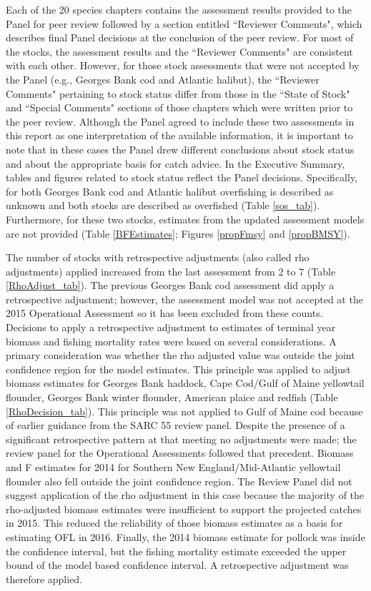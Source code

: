 Each of the 20 species chapters contains the assessment results provided to the Panel for peer review followed by a section entitled ``Reviewer Comments", which describes final Panel decisions at the conclusion of the peer review.  For most of the stocks, the assessment results and the ``Reviewer Comments" are consistent with each other.  However, for those stock assessments that were not accepted by the Panel (e.g., Georges Bank cod and Atlantic halibut), the ``Reviewer Comments" pertaining to stock status differ from those in the ``State of Stock" and ``Special Comments" sections of those chapters which were written prior to the peer review. Although the Panel agreed to include these two assessments in this report as one interpretation of the available information, it is important to note that in these cases the Panel drew different conclusions about stock status and about the appropriate basis for catch advice. In the Executive Summary, tables and figures related to stock status reflect the Panel decisions. Specifically, for both Georges Bank cod and Atlantic halibut overfishing is described as unknown and both stocks are described as overfished (Table \ref{sos_tab}). Furthermore, for these two stocks, estimates from the updated assessment models are not provided (Table \ref{BFEstimates}; Figures \ref{propFmsy} and \ref{propBMSY}).

The number of stocks with retrospective adjustments (also called rho adjustments)  applied increased from the last assessment from 2 to 7 (Table \ref{RhoAdjust_tab}). The previous Georges Bank cod assessment did apply a retrospective adjustment; however, the assessment model was not accepted  at the 2015 Operational Assessment so it has been excluded from these counts.  Decisions to apply a retrospective adjustment to estimates of terminal year biomass and fishing mortality rates were based on several considerations.   A primary consideration was whether the rho adjusted value was outside the joint confidence region for the model estimates.  This principle was applied to adjust biomass estimates for Georges Bank haddock, Cape Cod/Gulf of Maine yellowtail flounder, Georges Bank winter flounder, American plaice and redfish (Table \ref{RhoDecision_tab}).  This principle was not applied to Gulf of Maine cod because of earlier guidance from the SARC 55 review panel.  Despite the presence of a significant retrospective pattern at that meeting no adjustments were made; the review panel for the Operational Assessments followed that precedent.   Biomass and F estimates for 2014 for Southern New England/Mid-Atlantic  yellowtail flounder also fell outside the joint confidence region. The Review Panel did not suggest application of the rho adjustment in this case because the majority  of the rho-adjusted biomass estimates were insufficient to support the projected catches in 2015.  This reduced the reliability of those biomass estimates as a basis for estimating OFL in 2016. Finally, the 2014 biomass estimate  for pollock was inside the confidence interval, but the fishing mortality estimate exceeded the upper bound of the model based confidence interval. A retrospective adjustment was therefore applied. 

